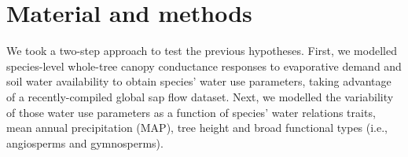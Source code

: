 \documentclass[11pt,twoside]{reedthesis}
\begin{document}
\section{Material and methods}\label{material-and-methods}

We took a two-step approach to test the previous hypotheses. First, we
modelled species-level whole-tree canopy conductance responses to
evaporative demand and soil water availability to obtain species' water
use parameters, taking advantage of a recently-compiled global sap flow
dataset. Next, we modelled the variability of those water use parameters
as a function of species' water relations traits, mean annual
precipitation (MAP), tree height and broad functional types (i.e.,
angiosperms and gymnosperms).\par
\begin{table}[!h]


\end{table}
\end{document}
